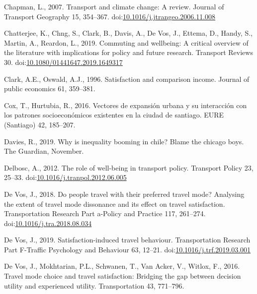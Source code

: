 \documentclass[]{elsarticle} %
\begin{document}
\leavevmode\hypertarget{ref-Chapman2007transport}{}%
Chapman, L., 2007. Transport and climate change: A review. Journal of
Transport Geography 15, 354--367.
doi:\href{https://doi.org/10.1016/j.jtrangeo.2006.11.008}{10.1016/j.jtrangeo.2006.11.008}

\leavevmode\hypertarget{ref-Chatterjee2019commuting}{}%
Chatterjee, K., Chng, S., Clark, B., Davis, A., De Vos, J., Ettema, D.,
Handy, S., Martin, A., Reardon, L., 2019. Commuting and wellbeing: A
critical overview of the literature with implications for policy and
future research. Transport Reviews 30.
doi:\href{https://doi.org/10.1080/01441647.2019.1649317}{10.1080/01441647.2019.1649317}

\leavevmode\hypertarget{ref-Clark1996satisfaction}{}%
Clark, A.E., Oswald, A.J., 1996. Satisfaction and comparison income.
Journal of public economics 61, 359--381.

\leavevmode\hypertarget{ref-Cox2016}{}%
Cox, T., Hurtubia, R., 2016. Vectores de expansión urbana y su
interacción con los patrones socioeconómicos existentes en la ciudad de
santiago. EURE (Santiago) 42, 185--207.

\leavevmode\hypertarget{ref-Davis2019}{}%
Davies, R., 2019. Why is inequality booming in chile? Blame the chicago
boys. The Guardian, November.

\leavevmode\hypertarget{ref-Delbosc2012role}{}%
Delbosc, A., 2012. The role of well-being in transport policy. Transport
Policy 23, 25--33.
doi:\href{https://doi.org/10.1016/j.tranpol.2012.06.005}{10.1016/j.tranpol.2012.06.005}

\leavevmode\hypertarget{ref-Devos2018people}{}%
De Vos, J., 2018. Do people travel with their preferred travel mode?
Analysing the extent of travel mode dissonance and its effect on travel
satisfaction. Transportation Research Part a-Policy and Practice 117,
261--274.
doi:\href{https://doi.org/10.1016/j.tra.2018.08.034}{10.1016/j.tra.2018.08.034}

\leavevmode\hypertarget{ref-Devos2019satisfaction}{}%
De Vos, J., 2019. Satisfaction-induced travel behaviour. Transportation
Research Part F-Traffic Psychology and Behaviour 63, 12--21.
doi:\href{https://doi.org/10.1016/j.trf.2019.03.001}{10.1016/j.trf.2019.03.001}

\leavevmode\hypertarget{ref-Devos2016travel}{}%
De Vos, J., Mokhtarian, P.L., Schwanen, T., Van Acker, V., Witlox, F.,
2016. Travel mode choice and travel satisfaction: Bridging the gap
between decision utility and experienced utility. Transportation 43,
771--796.
\end{document}
